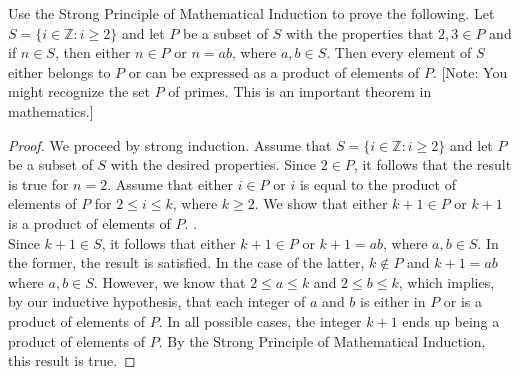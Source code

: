\documentclass[12pt]{article}
\newcommand{\Z}{\mathbb{Z}}
\newenvironment{problem}[2][Problem]{\begin{trivlist}
		\item[\hskip \labelsep {\bfseries #1}\hskip \labelsep {\bfseries #2.}]}{\end{trivlist}}
\begin{document}
	\begin{problem}{46}
		Use the Strong Principle of Mathematical Induction to prove the following. Let $S=\{i\in \Z: i\geq 2\}$ and let $P$ be a subset of $S$ with the properties that $2,3\in P$ and if $n\in S$, then either $n\in P$ or $n = ab$, where $a,b\in S$. Then every element of $S$ either belongs to $P$ or can be expressed as a product of elements of $P$. 
		[Note: You might recognize the set $P$ of primes. This is an important theorem in mathematics.]
		\begin{proof}
			We proceed by strong induction. Assume that $S=\{i\in \Z : i\geq 2\}$ and let $P$ be a subset of $S$ with the desired properties. Since $2\in P$, it follows that the result is true for $n=2$. Assume that either $i\in P$ or $i$ is equal to the product of elements of $P$ for $2\leq i \leq k$, where $k\geq 2$. We show that either $k+1\in P$ or $k+1$ is a product of elements of $P$. . \\
			 
			Since $k+1\in S$, it follows that either $k+1\in P$ or $k+1=ab$, where $a,b\in S$. In the former, the result is satisfied. In the case of the latter,  $k\not\in P$ and $k+1 = ab$ where $a,b\in S$. However, we know that $2\leq a \leq k$ and $2\leq b \leq k$, which implies, by our inductive hypothesis, that each integer of $a$ and $b$ is either in $P$ or is a product of elements of $P$. In all possible cases, the integer $k+1$ ends up being a product of elements of $P$.
			By the Strong Principle of Mathematical Induction, this result is true.
		\end{proof}
	\end{problem}
\end{document}
